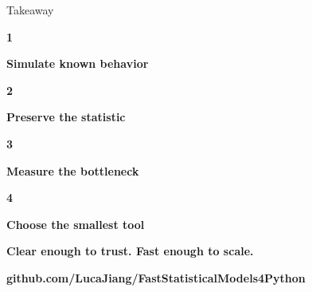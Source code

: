 \documentclass[final]{beamer}
\newlength{\sepwidth}
\newlength{\colwidth}
\newcommand{\separatorcolumn}{\begin{column}{\sepwidth}\end{column}}
\newcommand{\practicalstep}[3]{%
  \begin{minipage}[c]{0.44\linewidth}
    \centering
    {\Large\bfseries\color{#1}#2}\par
    {\normalsize\bfseries\color{ink}#3}
  \end{minipage}
}
\begin{document}
\begin{frame}[t]
\begin{columns}[t,totalwidth=0.94\paperwidth]
\begin{column}{\colwidth}
  \begin{alertblock}{Takeaway}
    \centering
    \practicalstep{cityured}{1}{Simulate known behavior}
    \hfill
    \practicalstep{threadteal}{2}{Preserve the statistic}
    \vspace{0.55em}\par
    \hfill
    \practicalstep{cityuorange}{3}{Measure the bottleneck}
    \hfill
    \practicalstep{jaxberry}{4}{Choose the smallest tool}
    \vspace{0.55em}

    {\Large\bfseries\color{cityumaroon}Clear enough to trust. Fast enough to scale.}\par
    \vspace{0.25em}
    {\normalsize\bfseries\color{ink}github.com/LucaJiang/FastStatisticalModels4Python}
  \end{alertblock}
\end{column}

\separatorcolumn
\end{columns}
\end{frame}
\end{document}
